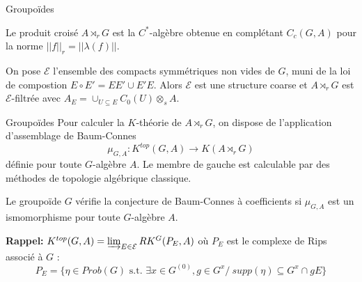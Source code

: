 \begin{frame}{Groupoïdes}
\begin{definitionfr}
Le produit croisé $A\rtimes_r G$ est la $C^*$-algèbre obtenue en complétant $C_c(G,A)$ pour la norme $||f||_r=||\lambda(f)||$.
\end{definitionfr}
\vspace{0.3 cm}
On pose $\mathcal E$ l'ensemble des compacts symmétriques non vides de $G$, muni de la loi de compostion $E\circ E' = EE' \cup E'E$. Alors $\mathcal E$ est une structure coarse et $A\rtimes_r G$ est $\mathcal E$-filtrée avec $A_E = \cup_{U\subseteq E	} C_0(U)\otimes_s A$. 
\end{frame}

\begin{frame}{Groupoïdes}
Pour calculer la $K$-théorie de $A\rtimes_r G$, on dispose de l'application d'assemblage de Baum-Connes
\[\mu_{G,A} : K^{top}(G,A) \rightarrow K(A \rtimes_r G)\]
définie pour toute $G$-algèbre $A$. Le membre de gauche est calculable par des méthodes de topologie algébrique classique.
\vspace{0.3 cm}
\begin{conj}
Le groupoïde $G$ vérifie la conjecture de Baum-Connes à coefficients si $\mu_{G,A}$ est un ismomorphisme pour toute $G$-algèbre $A$.
\end{conj}
\vspace{0.3 cm}
\textbf{Rappel:} $K^{top}(G,A)=\varinjlim_{E\in \mathcal E} RK^G(P_E,A)$ où $P_E$ est le complexe de Rips associé à $G$ :
\[P_E = \{\eta\in Prob(G) \text{ s.t. } \exists x\in G^{(0)},g\in G^x / \ supp (\eta) \subseteq G^x \cap gE  \}\]
\end{frame}

